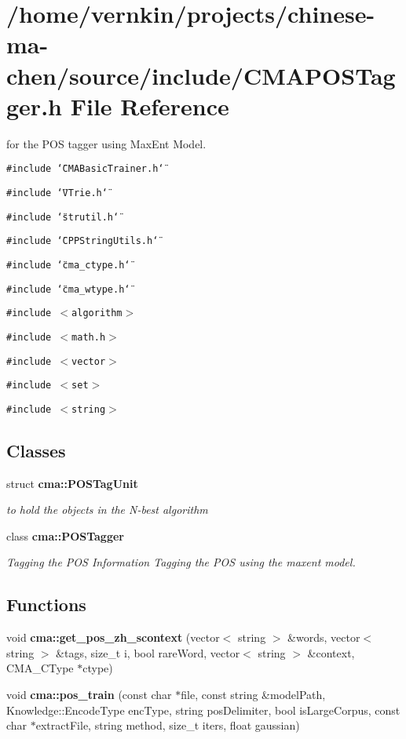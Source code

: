 \section{/home/vernkin/projects/chinese-ma-chen/source/include/CMAPOSTagger.h File Reference}
\label{CMAPOSTagger_8h}
for the POS tagger using MaxEnt Model.  


{\tt \#include \char`\"{}CMABasicTrainer.h\char`\"{}}\par
{\tt \#include \char`\"{}VTrie.h\char`\"{}}\par
{\tt \#include \char`\"{}strutil.h\char`\"{}}\par
{\tt \#include \char`\"{}CPPStringUtils.h\char`\"{}}\par
{\tt \#include \char`\"{}cma\_\-ctype.h\char`\"{}}\par
{\tt \#include \char`\"{}cma\_\-wtype.h\char`\"{}}\par
{\tt \#include $<$algorithm$>$}\par
{\tt \#include $<$math.h$>$}\par
{\tt \#include $<$vector$>$}\par
{\tt \#include $<$set$>$}\par
{\tt \#include $<$string$>$}\par
\subsection*{Classes}
\begin{CompactItemize}
\item 
struct {\bf cma::POSTagUnit}
\begin{CompactList}\small\item\em to hold the objects in the N-best algorithm \item\end{CompactList}\item 
class {\bf cma::POSTagger}
\begin{CompactList}\small\item\em Tagging the POS Information Tagging the POS using the maxent model. \item\end{CompactList}\end{CompactItemize}
\subsection*{Functions}
\begin{CompactItemize}
\item 
void {\bf cma::get\_\-pos\_\-zh\_\-scontext} (vector$<$ string $>$ \&words, vector$<$ string $>$ \&tags, size\_\-t i, bool rareWord, vector$<$ string $>$ \&context, CMA\_\-CType $\ast$ctype)
\item 
void {\bf cma::pos\_\-train} (const char $\ast$file, const string \&modelPath, Knowledge::EncodeType encType, string posDelimiter, bool isLargeCorpus, const char $\ast$extractFile, string method, size\_\-t iters, float gaussian)
\end{CompactItemize}


